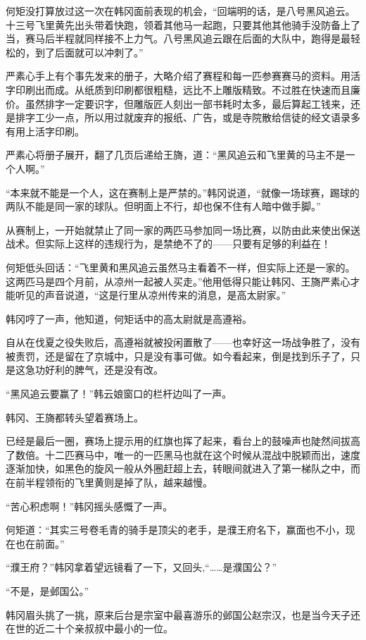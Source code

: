 何矩没打算放过这一次在韩冈面前表现的机会，“回端明的话，是八号黑风追云。十三号飞里黄先出头带着快跑，领着其他马一起跑，只要其他其他骑手没防备上了当，赛马后半程就同样接不上力气。八号黑风追云跟在后面的大队中，跑得是最轻松的，到了后面就可以冲刺了。”

严素心手上有个事先发来的册子，大略介绍了赛程和每一匹参赛赛马的资料。用活字印刷出而成。从纸质到印刷都很粗糙，远比不上雕版精致。不过胜在快速而且廉价。虽然排字一定要识字，但雕版匠人刻出一部书耗时太多，最后算起工钱来，还是排字工少一点，所以用过就废弃的报纸、广告，或是寺院散给信徒的经文语录多有用上活字印刷。

严素心将册子展开，翻了几页后递给王旖，道：“黑风追云和飞里黄的马主不是一个人啊。”

“本来就不能是一个人，这在赛制上是严禁的。”韩冈说道，“就像一场球赛，踢球的两队不能是同一家的球队。但明面上不行，却也保不住有人暗中做手脚。”

从赛制上，一开始就禁止了同一家的两匹马参加同一场比赛，以防由此来使出保送战术。但实际上这样的违规行为，是禁绝不了的——只要有足够的利益在！

何矩低头回话：“飞里黄和黑风追云虽然马主看着不一样，但实际上还是一家的。这两匹马是四个月前，从凉州一起被人买走。”他用低得只能让韩冈、王旖严素心才能听见的声音说道，“这是行里从凉州传来的消息，是高太尉家。”

韩冈哼了一声，他知道，何矩话中的高太尉就是高遵裕。

自从在伐夏之役失败后，高遵裕就被投闲置散了——也幸好这一场战争胜了，没有被责罚，还是留在了京城中，只是没有事可做。如今看起来，倒是找到乐子了，只是这急功好利的脾气，还是没有改。

“黑风追云要赢了！”韩云娘窗口的栏杆边叫了一声。

韩冈、王旖都转头望着赛场上。

已经是最后一圈，赛场上提示用的红旗也挥了起来，看台上的鼓噪声也陡然间拔高了数倍。十二匹赛马中，唯一的一匹黑马也就在这个时候从混战中脱颖而出，速度逐渐加快，如黑色的旋风一般从外圈赶超上去，转眼间就进入了第一梯队之中，而在前半程领衔的飞里黄则是掉了队，越来越慢。

“苦心积虑啊！”韩冈摇头感慨了一声。

何矩道：“其实三号卷毛青的骑手是顶尖的老手，是濮王府名下，赢面也不小，现在也在前面。”

“濮王府？”韩冈拿着望远镜看了一下，又回头,“……是濮国公？”

“不是，是邺国公。”

韩冈眉头挑了一挑，原来后台是宗室中最喜游乐的邺国公赵宗汉，也是当今天子还在世的近二十个亲叔叔中最小的一位。

